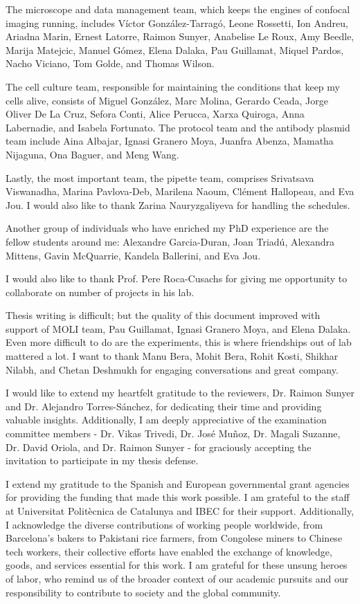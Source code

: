 \begin{Acknowledgements}
	The microscope and data management team, which keeps the engines of confocal imaging running, includes Víctor González-Tarragó, Leone Rossetti, Ion Andreu, Ariadna Marin, Ernest Latorre, Raimon Sunyer, Anabelise Le Roux, Amy Beedle, Marija Matejcic, Manuel Gómez, Elena Dalaka, Pau Guillamat, Miquel Pardos, Nacho Viciano, Tom Golde, and Thomas Wilson.
	
	The cell culture team, responsible for maintaining the conditions that keep my cells alive, consists of Miguel González, Marc Molina, Gerardo Ceada, Jorge Oliver De La Cruz, Sefora Conti, Alice Perucca, Xarxa Quiroga, Anna Labernadie, and Isabela Fortunato. The protocol team and the antibody plasmid team include Aina Albajar, Ignasi Granero Moya, Juanfra Abenza, Mamatha Nijaguna, Ona Baguer, and Meng Wang.
	
	Lastly, the most important team, the pipette team, comprises Srivatsava Viswanadha, Marina Pavlova-Deb, Marilena Naoum, Clément Hallopeau, and Eva Jou. I would also like to thank Zarina Nauryzgaliyeva for handling the schedules.
	
	Another group of individuals who have enriched my PhD experience are the fellow students around me: Alexandre Garcia-Duran, Joan Triadú, Alexandra Mittens, Gavin McQuarrie, Kandela Ballerini, and Eva Jou.
	
	I would also like to thank Prof. Pere Roca-Cusachs for giving me opportunity to collaborate on number of projects in his lab.
	
	Thesis writing is difficult; but the quality of this document improved with support of MOLI team, Pau Guillamat, Ignasi Granero Moya, and Elena Dalaka. Even more difficult to do are the experiments, this is where friendships out of lab mattered a lot. I want to thank Manu Bera, Mohit Bera, Rohit Kosti, Shikhar Nilabh, and Chetan Deshmukh for engaging conversations and great company.
	
	I would like to extend my heartfelt gratitude to the reviewers, Dr. Raimon Sunyer and Dr. Alejandro Torres-Sánchez, for dedicating their time and providing valuable insights. Additionally, I am deeply appreciative of the examination committee members - Dr. Vikas Trivedi, Dr. José Muñoz, Dr. Magali Suzanne, Dr. David Oriola, and Dr. Raimon Sunyer - for graciously accepting the invitation to participate in my thesis defense.
	
	I extend my gratitude to the Spanish and European governmental grant agencies for providing the funding that made this work possible. I am grateful to the staff at Universitat Politècnica de Catalunya and IBEC for their support. Additionally, I acknowledge the diverse contributions of working people worldwide, from Barcelona's bakers to Pakistani rice farmers, from  Congolese miners to Chinese tech workers, their collective efforts have enabled the exchange of knowledge, goods, and services essential for this work. I am grateful for these unsung heroes of labor, who remind us of the broader context of our academic pursuits and our responsibility to contribute to society and the global community.
	

\end{Acknowledgements}
